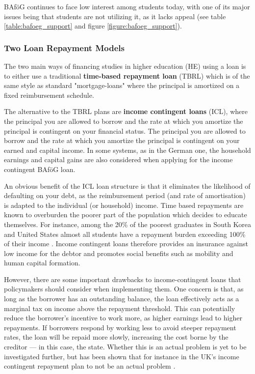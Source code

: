 BAföG continues to face low interest among students today, with one of its major issues being that students are not utilizing it, as it lacks appeal (see table \ref{table:bafoeg_support} and figure \ref{figure:bafoeg_support}). 

\subsubsection{Two Loan Repayment Models}
\label{subsection:loan-repayment-plan}
The two main ways of financing studies in higher education (HE) using a loan is to either use a traditional 
\textbf{time-based repayment loan} (TBRL) which is of the same style as standard "mortgage-loans" 
where the principal is amortized on a fixed reimbursement schedule.

The alternative to the TBRL plans are \textbf{income contingent loans} (ICL), where the 
principal you are allowed to borrow and the rate at which you amortize the principal is contingent on your financial status. The principal you are allowed to borrow and the 
rate at which you amortize the principal is contingent on your earned 
and capital income. In some systems, as in the German one, the household earnings 
and capital gains are also considered when applying for the income contingent BAföG loan.

An obvious benefit of the ICL loan structure is that it eliminates the likelihood 
of defaulting on your debt, as the reimbursement period 
(and rate of amortisation) is adapted to the individual (or household) income. 
Time based repayments are known to overburden the poorer part of the population which decides to 
educate themselves. For instance, among the 20\% of the poorest graduates in South Korea and United States 
almost all students have a repayment burden exceeding 100\% of their income 
\citep{chapman_income-contingent_2022}. 
Income contingent loans therefore provides an insurance against low income for the debtor and promotes social benefits such as mobility and human capital formation.

However, there are some important drawbacks to income-contingent loans that policymakers should consider when implementing them. 
One concern is that, as long as the borrower has an outstanding balance, the loan effectively acts as a marginal tax on income above the repayment threshold. 
This can potentially reduce the borrower’s incentive to work more, as higher earnings lead to higher repayments. 
If borrowers respond by working less to avoid steeper repayment rates, the loan will be repaid more slowly, increasing the cost borne by the creditor — in this case, the state.
Whether this is an actual problem is yet to be investigated further, but has been
shown that for instance in the UK's income contingent repayment plan to not 
be an actual problem \citep{britton_income_2020}. 

